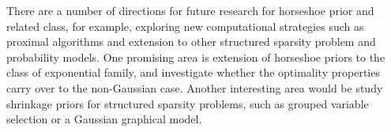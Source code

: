 \documentclass[11pt]{article}
\begin{document}
There are a number of directions for future research for horseshoe prior and related class, for example, exploring new computational strategies such as proximal algorithms and extension to other structured sparsity problem and probability models. One promising area is extension of horseshoe priors to the class of exponential family, and investigate whether the optimality properties carry over to the non-Gaussian case. Another interesting area would be study shrinkage priors for structured sparsity problems, such as grouped variable selection or a Gaussian graphical model. 


\end{document}
